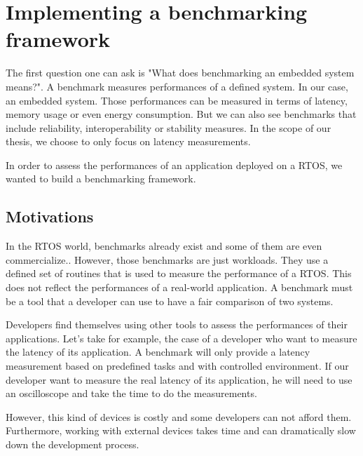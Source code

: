 \section{Implementing a benchmarking framework}


The first question one can ask is "What does benchmarking an embedded system means?".
A benchmark measures performances of a defined system.
In our case, an embedded system.
Those performances can be measured in terms of latency, memory usage or even energy consumption.
But we can also see benchmarks that include reliability, interoperability or stability measures.
In the scope of our thesis, we choose to only focus on latency measurements.

In order to assess the performances of an application deployed on a RTOS, we wanted to build a benchmarking framework.

\subsection{Motivations}

In the RTOS world, benchmarks already exist and some of them are even commercialize.. 
However, those benchmarks are just workloads.
They use a defined set of routines that is used to measure the performance of a RTOS.
This does not reflect the performances of a real-world application.
A benchmark must be a tool that a developer can use to have a fair comparison of two systems.

Developers find themselves using other tools to assess the performances of their applications.
Let's take for example, the case of a developer who want to measure the latency of its application.
A benchmark will only provide a latency measurement based on predefined tasks and with controlled environment.
If our developer want to measure the real latency of its application, he will need to use an oscilloscope and take the time to do the measurements.

However, this kind of devices is costly and some developers can not afford them.
Furthermore, working with external devices takes time and can dramatically slow down the development process.

